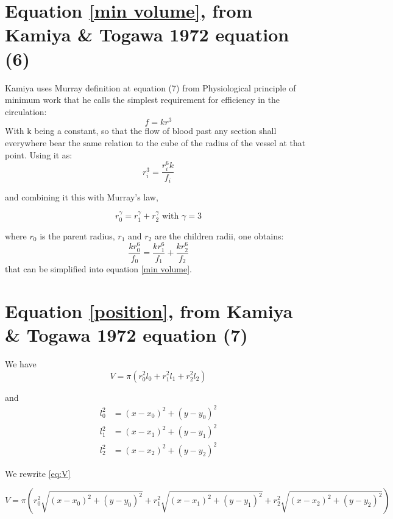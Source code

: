 \documentclass[a4paper, 11pt]{article} %
\newcommand{\sqlen}[1]{\ensuremath{(x - x_{#1})^2 + (y-y_{#1})^2}}
\begin{document}
\begin{appendix}
\section*{Equation \eqref{min volume}, from Kamiya \& Togawa 1972 equation  (6)}
Kamiya uses Murray definition at equation (7) from Physiological principle of minimum work \cite{murray1926physiological} that he calls the simplest requirement for efficiency in the circulation:
\begin{equation*}
f = k r^3
\end{equation*}
With k being a constant, so that the flow of blood past any section shall everywhere bear the same relation to the cube of the radius of the vessel at that point. Using it as:
\begin{equation*}
r_i^3 = \frac{r_i^6 k}{f_i}
\end{equation*}

and combining it this with Murray's law,

\begin{equation*}
r_0^\gamma = r_1^\gamma + r_2^\gamma \text{ with } \gamma = 3
\end{equation*}

 where $r_0$ is the parent radius, $r_1$ and $r_2$ are the children radii, one obtains:
\begin{equation*}
\frac{k r_0^6}{f_0} = \frac{k r_1^6}{f_1} + \frac{k r_2^6}{f_2}
\end{equation*}
that can be simplified into equation \eqref{min volume}.


\section*{Equation \eqref{position}, from Kamiya \& Togawa 1972 equation  (7) }
We have
\begin{equation*}
\label{eq:V}
V = \pi(r_0^2 l_0 + r_1^2 l_1 + r_2^2 l_2)
\end{equation*}

and
\begin{align*}
l_0^2 &= \sqlen{0} \\
l_1^2 &= \sqlen{1} \\
l_2^2 &= \sqlen{2} 
\end{align*}

We rewrite \eqref{eq:V}

\begin{equation*}
V = \pi(r_0^2 \sqrt{\sqlen{0}} + r_1^2 \sqrt{\sqlen{1}} + r_2^2 \sqrt{\sqlen{2}})
\end{equation*}


\end{appendix}
\end{document}
